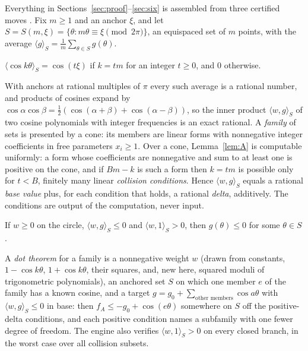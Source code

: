 \documentclass[11pt]{article}
\begin{document}
Everything in Sections~\ref{sec:proof}--\ref{sec:six} is assembled from three certified moves \cite{L4,Me19}. Fix $m\ge1$ and an anchor $\xi$, and let $S=S(m,\xi)=\{\theta: m\theta\equiv\xi\pmod{2\pi}\}$, an equispaced set of $m$ points, with the average $\langle g\rangle_S=\frac1m\sum_{\theta\in S}g(\theta)$.

\begin{lemma}\label{lem:A}
$\langle\cos k\theta\rangle_S=\cos(t\xi)$ if $k=tm$ for an integer $t\ge0$, and $0$ otherwise.
\end{lemma}

With anchors at rational multiples of $\pi$ every such average is a rational number, and products of cosines expand by $\cos\alpha\cos\beta=\frac12(\cos(\alpha+\beta)+\cos(\alpha-\beta))$, so the inner product $\langle w,g\rangle_S$ of two cosine polynomials with integer frequencies is an exact rational. A \emph{family} of sets is presented by a cone: its members are linear forms with nonnegative integer coefficients in free parameters $x_i\ge1$. Over a cone, Lemma~\ref{lem:A} is computable uniformly: a form whose coefficients are nonnegative and sum to at least one is positive on the cone, and if $Bm-k$ is such a form then $k=tm$ is possible only for $t<B$, finitely many linear \emph{collision conditions}. Hence $\langle w,g\rangle_S$ equals a rational \emph{base value} plus, for each condition that holds, a rational \emph{delta}, additively. The conditions are output of the computation, never input.

\begin{lemma}\label{lem:B}
If $w\ge0$ on the circle, $\langle w,g\rangle_S\le0$ and $\langle w,1\rangle_S>0$, then $g(\theta)\le0$ for some $\theta\in S$.
\end{lemma}

A \emph{dot theorem} for a family is a nonnegative weight $w$ (drawn from constants, $1-\cos k\theta$, $1+\cos k\theta$, their squares, and, new here, squared moduli of trigonometric polynomials), an anchored set $S$ on which one member $e$ of the family has a known cosine, and a target $g=g_0+\sum_{\text{other members}}\cos a\theta$ with $\langle w,g\rangle_S\le0$ in base: then $f_A\le-g_0+\cos(e\theta)$ somewhere on $S$ off the positive-delta conditions, and each positive condition names a subfamily with one fewer degree of freedom. The engine also verifies $\langle w,1\rangle_S>0$ on every closed branch, in the worst case over all collision subsets.
\end{document}

